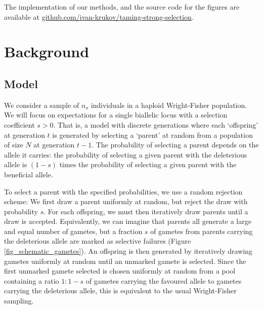 \documentclass[9pt,twocolumn,twoside,lineno]{gsajnl}
\begin{document}
The implementation of our methods,
and the source code for the figures are available at
\url{github.com/ivan-krukov/taming-strong-selection}.


\section{Background}
\label{sec_background}
\subsection{Model}
We consider a sample of $n_o$ individuals in a haploid Wright-Fisher population. We will focus on expectations for a single biallelic locus with a selection coefficient $s>0$. That is, a model with discrete generations where each `offspring' at generation $t$ is generated by selecting a `parent' at random from a population of size $N$ at generation $t-1$.  The probability of selecting a parent depends on the allele it carries: the probability of selecting a given parent with the deleterious allele is $(1-s)$ times the probability of selecting a given parent with the beneficial allele. 

To select a parent with the specified probabilities, we use a random rejection scheme: We first draw a parent uniformly at random, but reject the draw with probability $s.$ For each offspring, we must then iteratively draw parents until a draw is accepted.  
Equivalently, we can imagine that parents all generate a large and equal number of gametes, but a fraction $s$ of gametes from parents carrying the deleterious allele are marked as selective failures (Figure \ref{fig_schematic_gametes}). An offspring is then generated by iteratively drawing gametes uniformly at random until an unmarked gamete is selected. Since the first unmarked gamete selected is chosen uniformly at random from a pool containing a ratio $1:1-s$ of gametes carrying the favoured allele to gametes carrying the deleterious allele, this is equivalent to the usual Wright-Fisher sampling.  
 
\end{document}
